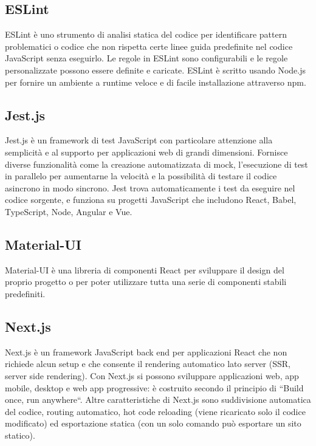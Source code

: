\subsection{ESLint}
ESLint è uno strumento di analisi statica del codice per identificare pattern problematici o codice che non rispetta certe linee guida predefinite nel codice JavaScript senza eseguirlo.
Le regole in ESLint sono configurabili e le regole personalizzate possono essere definite e caricate. ESLint è scritto usando Node.js per fornire un ambiente a runtime veloce e di facile installazione attraverso npm.

\subsection{Jest.js}
Jest.js è un framework di test JavaScript con particolare attenzione alla semplicità e al supporto per applicazioni web di grandi dimensioni. Fornisce diverse funzionalità come la creazione automatizzata di mock, l'esecuzione di test in parallelo per aumentarne la velocità e la possibilità di testare il codice asincrono in modo sincrono.
Jest trova automaticamente i test da eseguire nel codice sorgente, e funziona su progetti JavaScript che includono React, Babel, TypeScript, Node, Angular e Vue.

\subsection{Material-UI}
Material-UI è una libreria di componenti React per sviluppare il design del proprio progetto o per poter utilizzare tutta una serie di componenti stabili predefiniti.

\subsection{Next.js}
Next.js è un framework JavaScript back end per applicazioni React che non richiede alcun setup e che consente il rendering automatico lato server (SSR, server side rendering).
Con Next.js si possono sviluppare applicazioni web, app mobile, desktop e web app progressive: è costruito secondo il principio di “Build once, run anywhere“.
Altre caratteristiche di Next.js sono suddivisione automatica del codice, routing automatico, hot code reloading (viene ricaricato solo il codice modificato) ed esportazione statica (con un solo comando può esportare un sito statico).

